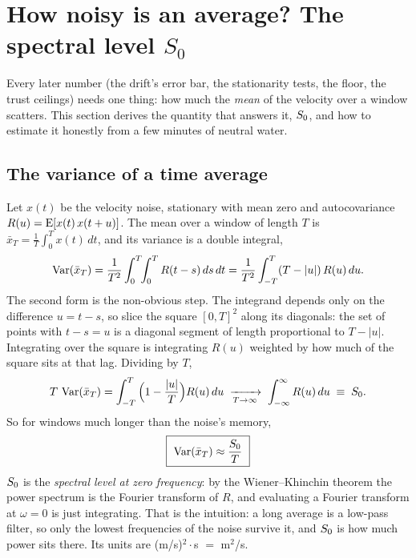 \section{How noisy is an average? The spectral level \texorpdfstring{$S_0$}{S0}}
\label{sec:cond-noise}

Every later number (the drift's error bar, the stationarity tests, the floor, the
trust ceilings) needs one thing: how much the \emph{mean} of the velocity over a
window scatters. This section derives the quantity that answers it, $S_0$, and
how to estimate it honestly from a few minutes of neutral water.

\subsection{The variance of a time average}

Let $x(t)$ be the velocity noise, stationary with mean zero and autocovariance
$R(u) = \operatorname{E}[x(t)\,x(t+u)]$. The mean over a window of length $T$ is
$\bar x_T = \frac1T\int_0^T x(t)\,dt$, and its variance is a double integral,
\[
  \operatorname{Var}(\bar x_T) = \frac{1}{T^2}\int_0^T\!\!\int_0^T R(t-s)\,ds\,dt
                 = \frac{1}{T^2}\int_{-T}^{T}(T-|u|)\,R(u)\,du .
\]
The second form is the non-obvious step. The integrand depends only on the
difference $u = t-s$, so slice the square $[0,T]^2$ along its diagonals: the set
of points with $t-s = u$ is a diagonal segment of length proportional to $T-|u|$.
Integrating over the square is integrating $R(u)$ weighted by how much of the
square sits at that lag. Dividing by $T$,
\[
  T\,\operatorname{Var}(\bar x_T) = \int_{-T}^{T}\Big(1-\frac{|u|}{T}\Big)R(u)\,du
  \;\xrightarrow[T\to\infty]{}\; \int_{-\infty}^{\infty}R(u)\,du \;\equiv\; S_0 .
\]
So for windows much longer than the noise's memory,
\[
  \boxed{\ \operatorname{Var}(\bar x_T) \approx \frac{S_0}{T}\ }
\]
$S_0$ is the \emph{spectral level at zero frequency}: by the Wiener--Khinchin
theorem the power spectrum is the Fourier transform of $R$, and evaluating a
Fourier transform at $\omega = 0$ is just integrating. That is the intuition: a
long average is a low-pass filter, so only the lowest frequencies of the noise
survive it, and $S_0$ is how much power sits there. Its units are
(m/s)$^2\cdot$s $=$ m$^2$/s.

